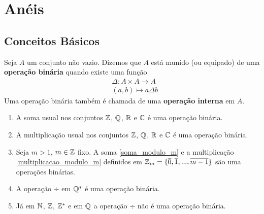 \chapter{Anéis}
\section{Conceitos Básicos} %
\label{sec:conceitos_basicos}
\begin{definicao}
    Seja $A$ um conjunto não vazio. Dizemos que $A$ está munido (ou equipado) de uma \textbf{operação binária} quando
    existe uma função
    \begin{align*}
        &\Delta : A \times A \to A\\
        &(a,b) \longmapsto a\Delta b
    \end{align*}
    Uma operação binária também é chamada de uma \textbf{operação interna} em $A$.
\end{definicao}

\begin{exemplos}
    \begin{enumerate}[label={\arabic*})]
        \item A soma usual nos conjuntos $\mathbb{Z}$, $\mathbb{Q}$, $\mathbb{R}$ e $\mathbb{C}$ é uma operação binária.

        \item A multiplicação usual nos conjuntos $\mathbb{Z}$, $\mathbb{Q}$, $\mathbb{R}$ e $\mathbb{C}$ é uma operação binária.

        \item Seja $m > 1$, $m \in \mathbb{Z}$ fixo. A soma \eqref{soma_modulo_m} e a multiplicação \eqref{multiplicacao_modulo_m} definidos em $\mathbb{Z}_m =
            \{\overline{0},\overline{1},...,\overline{m-1}\}$ são uma operações binárias.

        \item A operação $\div$ em $\mathbb{Q}^{*}$ é uma operação binária.
        \item Já em $\mathbb{N}$, $\mathbb{Z}$, $\mathbb{Z}^{*}$ e em $\mathbb{Q}$ a operação $\div$ não é uma operação binária.
    \end{enumerate}
\end{exemplos}

